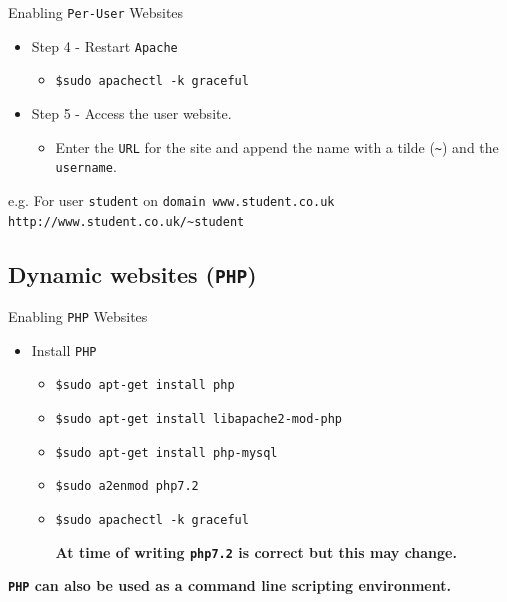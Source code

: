 \documentclass[xcolor=table]{beamer}
\begin{document}
\begin{frame}{Enabling \texttt{Per-User} Websites}
  \begin{itemize}
     \item Step 4 - Restart \texttt{Apache}
       \begin{itemize}
         \item \texttt{\$sudo apachectl -k graceful}
       \end{itemize}
     \item  Step 5 - Access the user website.
       \begin{itemize}
         \item Enter the \texttt{URL} for the site and append the name with a tilde (\texttt{\textasciitilde}) and the \texttt{username}. 
       \end{itemize}
   \end{itemize}
   \begin{tcolorbox}
    \begin{center}
      \scriptsize e.g. For user \texttt{student} on \texttt{domain www.student.co.uk}\\\texttt{http://www.student.co.uk/\textasciitilde student}
    \end{center}
  \end{tcolorbox}
\end{frame}

\subsection{Dynamic websites (\texttt{PHP})}
\begin{frame}{Enabling \texttt{PHP} Websites}
   \begin{itemize}
      \item Install \texttt{PHP}
        \begin{itemize}
          \item \texttt{\$sudo apt-get install php}
          \item \texttt{\$sudo apt-get install libapache2-mod-php}
          \item \texttt{\$sudo apt-get install php-mysql}
          \item \texttt{\$sudo a2enmod php7.2}
          \item \texttt{\$sudo apachectl -k graceful}
            \begin{tcolorbox}
              \begin{center}
                 \scriptsize \textbf{At time of writing \texttt{php7.2} is correct but this may change.}
              \end{center}
            \end{tcolorbox}
        \end{itemize}
    \end{itemize}
    \begin{tcolorbox}
      \begin{center}
        \scriptsize \textbf{\texttt{PHP} can also be used as a command line scripting environment.}
      \end{center}
    \end{tcolorbox}
\end{frame}
\end{document}
